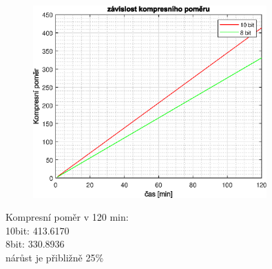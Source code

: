 \documentclass[10pt, a4paper]{article}%
\begin{document}
\begin{enumerate}
			\begin{figure}[ht!]
				\centering
				\includegraphics[width=0.8\textwidth]{kompres.eps}
			\end{figure}

			Kompresní poměr v 120 min:\\
			10bit: 413.6170\\
			8bit: 330.8936\\
			nárůst je přibližně 25\%\\
		\end{enumerate}
		
%		
	
\end{document}

